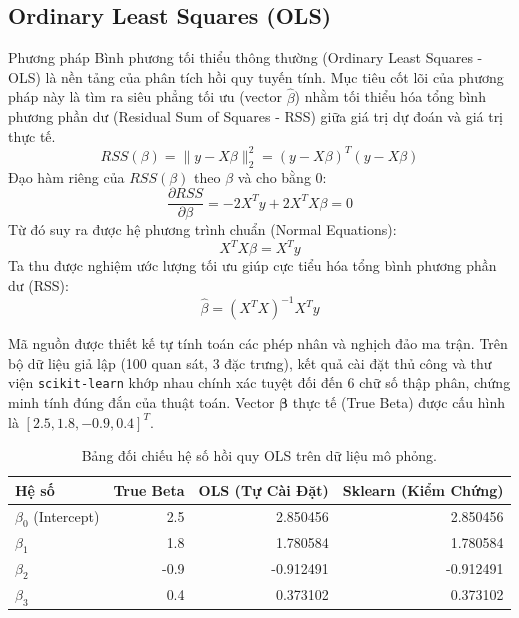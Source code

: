 \documentclass[12pt,a4paper]{article}
\begin{document}
\subsection{Ordinary Least Squares (OLS)}
Phương pháp Bình phương tối thiểu thông thường (Ordinary Least Squares - OLS) là nền tảng của phân tích hồi quy tuyến tính. Mục tiêu cốt lõi của phương pháp này là tìm ra siêu phẳng tối ưu (vector $\hat{\beta}$) nhằm tối thiểu hóa tổng bình phương phần dư (Residual Sum of Squares - RSS) giữa giá trị dự đoán và giá trị thực tế. \\
\begin{equation}
    RSS(\beta) = \|y - X\beta\|_2^2 = (y - X\beta)^T(y - X\beta)
\end{equation}
 Đạo hàm riêng của $RSS(\beta)$ theo $\beta$ và cho bằng $0$:
 \begin{equation}
     \frac{\partial RSS}{\partial \beta} = -2X^T y + 2X^T X \beta = 0
 \end{equation}
 Từ đó suy ra được hệ phương trình chuẩn (Normal Equations):
 \begin{equation}
     X^T X \beta = X^T y
 \end{equation}
 Ta thu được nghiệm ước lượng tối ưu giúp cực tiểu hóa tổng bình phương phần dư (RSS):
\begin{equation}
    \hat{\beta} = (X^T X)^{-1} X^T y
\end{equation}

Mã nguồn được thiết kế tự tính toán các phép nhân và nghịch đảo ma trận. Trên bộ dữ liệu giả lập (100 quan sát, 3 đặc trưng), kết quả cài đặt thủ công và thư viện \texttt{scikit-learn} khớp nhau chính xác tuyệt đối đến 6 chữ số thập phân, chứng minh tính đúng đắn của thuật toán. Vector $\boldsymbol{\beta}$ thực tế (True Beta) được cấu hình là $[2.5, 1.8, -0.9, 0.4]^T$.

\begin{table}[H]
    \centering
    \begin{tabular}{lrrr}
        \toprule
        \textbf{Hệ số} & \textbf{True Beta} & \textbf{OLS (Tự Cài Đặt)} & \textbf{Sklearn (Kiểm Chứng)} \\
        \midrule
        $\beta_0$ (Intercept) & 2.5 & 2.850456 & 2.850456 \\
        $\beta_1$ & 1.8 & 1.780584 & 1.780584 \\
        $\beta_2$ & -0.9 & -0.912491 & -0.912491 \\
        $\beta_3$ & 0.4 & 0.373102 & 0.373102 \\
        \bottomrule
    \end{tabular}
    \caption{Bảng đối chiếu hệ số hồi quy OLS trên dữ liệu mô phỏng.}
    \label{tab:ols_coef}
\end{table}
\end{document}
